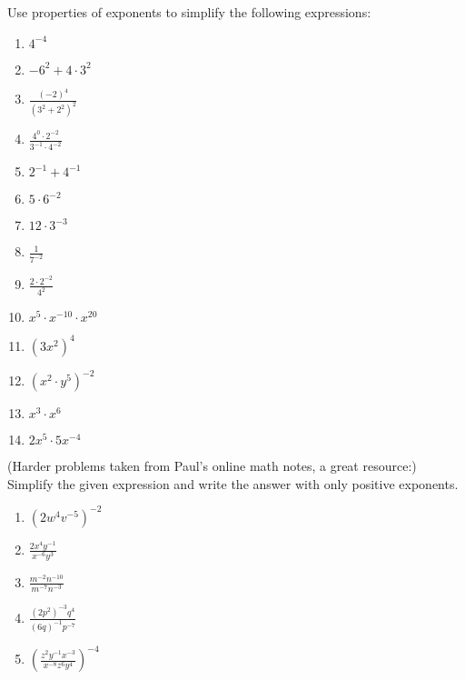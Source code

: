 \documentclass[11pt]{amsart}
\begin{document}
Use properties of exponents to simplify the following expressions: 
\begin{enumerate}
    \item $4^{-4}$\\
    \item $- {6^2} + 4 \cdot {3^2}$\\
    \item $ \frac{{{{\left( { - 2} \right)}^4}}}{{{{\left( {{3^2} + {2^2}} \right)}^2}}}$\\
    \item $\frac{{{4^0} \cdot {2^{ - 2}}}}{{{3^{ - 1}} \cdot {4^{ - 2}}}}$\\
    \item ${2^{ - 1}} + {4^{ - 1}}$\\
    \item $5\cdot 6^{-2}$\\
    \item $12\cdot 3^{-3}$\\
    \item $\frac{1}{7^{-2}}$\\
    \item $\frac{2\cdot 2^{-2}}{4^2}$\\
    \item $x^5\cdot x^{-10}\cdot x^{20}$\\
    \item $(3x^2)^4$\\
    \item $(x^2\cdot y^5)^{-2}$\\
    \item $x^3\cdot x^6$\\
    \item $2x^5\cdot 5x^{-4}$\\
\end{enumerate}
(Harder problems taken from Paul's online math notes, a great resource:) Simplify the given expression and write the answer with only positive exponents.
\begin{enumerate}
    \item ${\left( {2{w^4}{v^{ - 5}}} \right)^{ - 2}}$\\
    \item $ \frac{{2{x^4}{y^{ - 1}}}}{{{x^{ - 6}}{y^3}}}$\\
    \item $ \frac{{{m^{ - 2}}{n^{ - 10}}}}{{{m^{ - 7}}{n^{ - 3}}}}$\\
    \item $ \frac{{{{\left( {2{p^2}} \right)}^{ - 3}}{q^4}}}{{{{\left( {6q} \right)}^{ - 1}}{p^{ - 7}}}}$\\
    \item ${\left( { \frac{{{z^2}{y^{ - 1}}{x^{ - 3}}}}{{{x^{ - 8}}{z^6}{y^4}}}} \right)^{ - 4}}$\\
\end{enumerate}
\newpage
\end{document}
